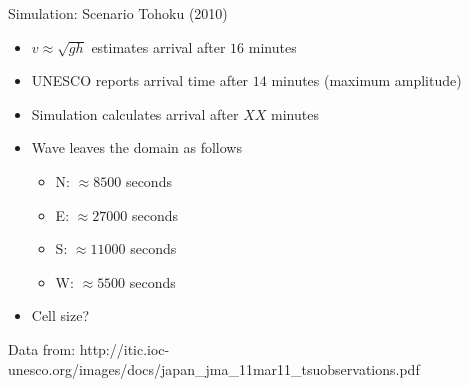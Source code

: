 \documentclass[shortpres]{beamer}
\begin{document}
\begin{frame}{Simulation: Scenario Tohoku (2010)}
		\begin{itemize}
			\item $v \approx \sqrt{gh}$ estimates arrival after $16$ minutes
			\item UNESCO reports arrival time after $14$ minutes (maximum amplitude)
			\item Simulation calculates arrival after $XX$ minutes
			\item Wave leaves the domain as follows
			\begin{itemize}
				\item N: $\approx 8500$ seconds
				\item E: $\approx 27000$ seconds
				\item S: $\approx 11000$ seconds
				\item W: $\approx 5500$ seconds
			\end{itemize}
			\item Cell size?
		\end{itemize}
		\vfill
		\flushleft
		{\fontsize{5}{5} \selectfont Data from: http://itic.ioc-unesco.org/images/docs/japan\_jma\_11mar11\_tsuobservations.pdf}	
\end{frame}
\end{document}
